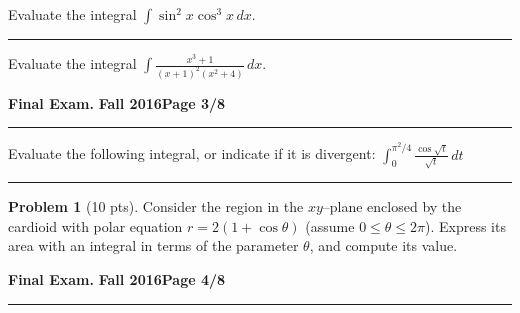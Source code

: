 \documentclass[12pt]{article}
\theoremstyle{definition}
\newtheorem{problem}{Problem}
\begin{document}
{\problem[5 pts] Evaluate the integral $\displaystyle{\int
    \sin^2 x \cos^3 x\, dx}$.
\vspace{3.5cm}
\begin{flushright}
\end{flushright}
\hrule

{\problem[5 pts] Evaluate the integral $\displaystyle{\int \frac{x^3+1}{(x+1)^2(x^2+4)}\, dx}$.}
\vspace{4.4cm}
\begin{flushright}
\end{flushright}
\newpage


\hfill{\large\bf Final Exam.}\hfill{\large\bf
  Fall 2016}\hfill{\large\bf Page 3/8}\hrule

\bigskip
{\problem[10 pts] Evaluate the following integral, or indicate if it is
divergent: $\displaystyle{\int_0^{\pi^2/4} \frac{\cos \sqrt{t}}{\sqrt{t}}\, dt}$
\vspace{10cm}
\begin{flushright}
\end{flushright}
\hrule

\begin{problem}[10 pts]
Consider the region in the $xy$--plane enclosed by the cardioid with polar equation $r = 2(1+\cos \theta)$ (assume $0 \leq \theta \leq 2\pi$).  Express its area with an integral in terms of the parameter $\theta$, and compute its value.
\vspace{6cm}
\begin{flushright}
\end{flushright}
\end{problem}
\newpage

\hfill{\large\bf Final Exam.}\hfill{\large\bf
  Fall 2016}\hfill{\large\bf Page 4/8}\hrule

}}
\end{document}
